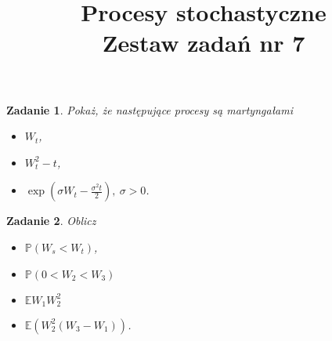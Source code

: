 \documentclass{mwart}
\title{Procesy stochastyczne\\ Zestaw zadań nr 7}
\newtheorem{zd}{Zadanie}
\begin{document}

\maketitle
\begin{zd}
	Pokaż, że następujące procesy są martyngałami
	\begin{itemize}
		\item $W_t$,
		\item $W_t^2 - t$,
		\item $\exp\left(\sigma W_t - \frac{\sigma^2t}{2}\right),\ \sigma > 0$.
	\end{itemize}
\end{zd}
\begin{zd}
	Oblicz
	\begin{itemize}
		\item $\mathbb{P}(W_s < W_t)$,
		\item $\mathbb{P}(0 < W_2 < W_3)$
		\item $\mathbb{E}W_1W_2^2$
		\item $\mathbb{E}\left(W_2^2(W_3 - W_1)\right)$.
	\end{itemize}
\end{zd}
\end{document}
